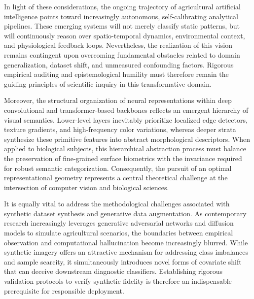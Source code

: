 \documentclass[Times,12pt,oneside,openany,print,index]{report}
\begin{document}
In light of these considerations, the ongoing trajectory of agricultural artificial intelligence points toward increasingly autonomous, self-calibrating analytical pipelines. These emerging systems will not merely classify static patterns, but will continuously reason over spatio-temporal dynamics, environmental context, and physiological feedback loops. Nevertheless, the realization of this vision remains contingent upon overcoming fundamental obstacles related to domain generalization, dataset shift, and unmeasured confounding factors. Rigorous empirical auditing and epistemological humility must therefore remain the guiding principles of scientific inquiry in this transformative domain.

Moreover, the structural organization of neural representations within deep convolutional and transformer-based backbones reflects an emergent hierarchy of visual semantics. Lower-level layers inevitably prioritize localized edge detectors, texture gradients, and high-frequency color variations, whereas deeper strata synthesize these primitive features into abstract morphological descriptors. When applied to biological subjects, this hierarchical abstraction process must balance the preservation of fine-grained surface biometrics with the invariance required for robust semantic categorization. Consequently, the pursuit of an optimal representational geometry represents a central theoretical challenge at the intersection of computer vision and biological sciences.

It is equally vital to address the methodological challenges associated with synthetic dataset synthesis and generative data augmentation. As contemporary research increasingly leverages generative adversarial networks and diffusion models to simulate agricultural scenarios, the boundaries between empirical observation and computational hallucination become increasingly blurred. While synthetic imagery offers an attractive mechanism for addressing class imbalances and sample scarcity, it simultaneously introduces novel forms of covariate shift that can deceive downstream diagnostic classifiers. Establishing rigorous validation protocols to verify synthetic fidelity is therefore an indispensable prerequisite for responsible deployment.
\end{document}
